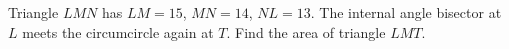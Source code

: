 Triangle $LMN$ has $LM=15$, $MN=14$, $NL=13$. The internal angle bisector at $L$ meets the circumcircle again at $T$. Find the area of triangle $LMT$.
